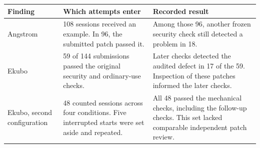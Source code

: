 \begin{tabularx}{\linewidth}{@{}p{.18\linewidth}XX@{}}
\toprule
Finding & Which attempts enter & Recorded result \\
\midrule
Angstrom & 108 sessions received an example. In 96, the submitted patch passed it. & Among those 96, another frozen security check still detected a problem in 18. \\
\addlinespace
Ekubo & 59 of 144 submissions passed the original security and ordinary-use checks. & Later checks detected the audited defect in 17 of the 59. Inspection of these patches informed the later checks. \\
\addlinespace
Ekubo, second configuration & 48 counted sessions across four conditions. Five interrupted starts were set aside and repeated. & All 48 passed the mechanical checks, including the follow-up checks. This set lacked comparable independent patch review. \\
\bottomrule
\end{tabularx}
